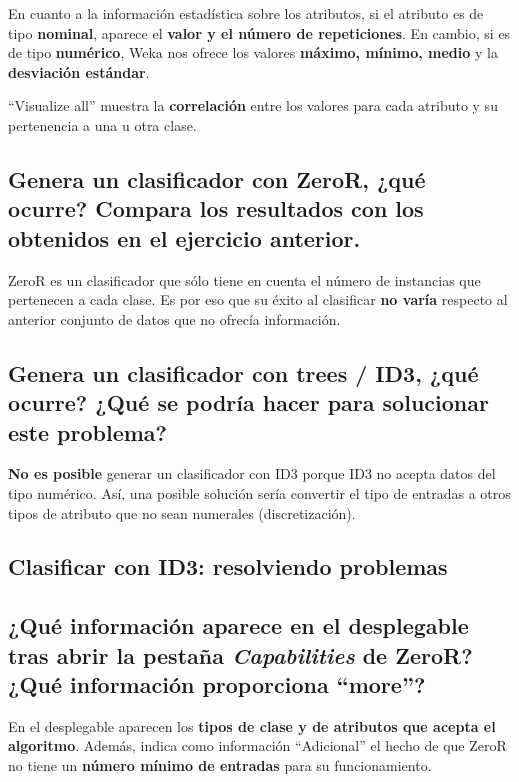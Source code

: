 \documentclass[12pt]{article}
\begin{document}
En cuanto a la información estadística sobre los atributos, si el atributo es de tipo \textbf{nominal}, aparece el \textbf{valor y el número de repeticiones}. En cambio, si es de tipo \textbf{numérico}, Weka nos ofrece los valores \textbf{máximo, mínimo, medio} y la \textbf{desviación estándar}.

``Visualize all'' muestra la \textbf{correlación} entre los valores para cada atributo y su pertenencia a una u otra clase.

\subsection*{\small Genera un clasificador con ZeroR, ¿qué ocurre? Compara los resultados con los obtenidos en el ejercicio anterior.}

ZeroR es un clasificador que sólo tiene en cuenta el número de instancias que pertenecen a cada clase. Es por eso que su éxito al clasificar \textbf{no varía} respecto al anterior conjunto de datos que no ofrecía información.

\subsection*{\small Genera un clasificador con trees / ID3, ¿qué ocurre? ¿Qué se podría hacer para solucionar este problema?}

\textbf{No es posible} generar un clasificador con ID3 porque ID3 no acepta datos del tipo numérico. Así, una posible solución sería convertir el tipo de entradas a otros tipos de atributo que no sean numerales (discretización).

\newpage

\begin{center}
\section{Clasificar con ID3: resolviendo problemas}
\end{center}

\subsection*{\small ¿Qué información aparece en el desplegable tras abrir la pestaña \emph{Capabilities} de ZeroR? ¿Qué información proporciona ``more''?}

En el desplegable aparecen los \textbf{tipos de clase y de atributos que acepta el algoritmo}. Además, indica como información ``Adicional'' el hecho de que ZeroR no tiene un \textbf{número mínimo de entradas} para su funcionamiento.
\end{document}

